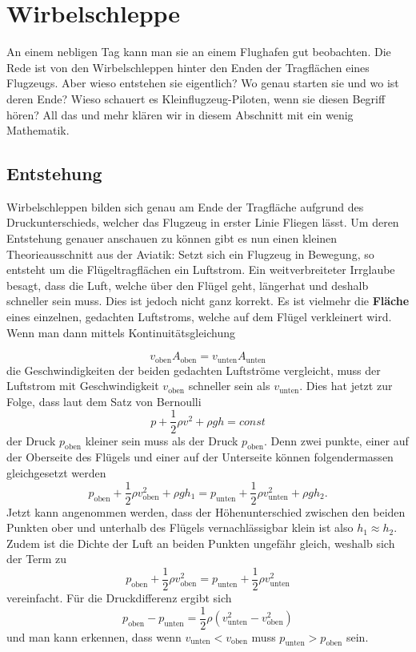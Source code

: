 %
%
%
\section{Wirbelschleppe}
An einem nebligen Tag kann man sie an einem Flughafen gut beobachten. 
Die Rede ist von den Wirbelschleppen hinter den Enden der Tragflächen eines Flugzeugs.
Aber wieso entstehen sie eigentlich? 
Wo genau starten sie und wo ist deren Ende?
Wieso schauert es Kleinflugzeug-Piloten, wenn sie diesen Begriff hören?
All das und mehr klären wir in diesem Abschnitt mit ein wenig Mathematik.

\subsection{Entstehung}
Wirbelschleppen bilden sich genau am Ende der Tragfläche aufgrund des Druckunterschieds, welcher das Flugzeug in erster Linie Fliegen lässt.
Um deren Entstehung genauer anschauen zu können gibt es nun einen kleinen Theorieausschnitt aus der Aviatik:
Setzt sich ein Flugzeug in Bewegung, so entsteht um die Flügeltragflächen ein Luftstrom.
Ein weitverbreiteter Irrglaube besagt, dass die Luft, welche über den Flügel geht, \glqq länger\grqq hat und deshalb schneller sein muss.
Dies ist jedoch nicht ganz korrekt.
Es ist vielmehr die \textbf{Fläche} eines einzelnen, gedachten Luftstroms, welche auf dem Flügel verkleinert wird.%
Wenn man dann mittels Kontinuitätsgleichung

\[
v_{\text{oben}}A_{\text{oben}} 
=
v_{\text{unten}}A_{\text{unten}}
\]
die Geschwindigkeiten der beiden gedachten Luftströme vergleicht, muss der Luftstrom mit Geschwindigkeit $v_{\text{oben}}$ schneller sein als $v_{\text{unten}}$.
Dies hat jetzt zur Folge, dass laut dem Satz von Bernoulli 
\[
p+\frac{1}{2}\rho v^2+\rho gh
=
const
\]
der Druck $p_{\text{oben}}$ kleiner sein muss als der Druck $p_{\text{oben}}$.
Denn zwei punkte, einer auf der Oberseite des Flügels und einer auf der Unterseite können folgendermassen gleichgesetzt werden
\[
p_{\text{oben}}+\frac{1}{2}\rho v^2_{\text{oben}} + \rho gh_1 
=
p_{\text{unten}}+\frac{1}{2}\rho v^2_{\text{unten}}+\rho gh_2.
\]
Jetzt kann angenommen werden, dass der Höhenunterschied zwischen den beiden Punkten ober und unterhalb des Flügels vernachlässigbar klein ist also \(h_1\approx h_2\).
Zudem ist die Dichte der Luft an beiden Punkten ungefähr gleich, weshalb sich der Term zu 
\[
p_{\text{oben}}+\frac{1}{2}\rho v^2_{\text{oben}} 
=
p_{\text{unten}}+\frac{1}{2}\rho v^2_{\text{unten}}
\]
vereinfacht.
Für die Druckdifferenz ergibt sich
\[
p_{\text{oben}}-p_{\text{unten}} 
=
\frac{1}{2}\rho( v^2_{\text{unten}}-v^2_{\text{oben}})
\]
und man kann erkennen, dass wenn $v_{\text{unten}} < v_{\text{oben}}$ muss $p_{\text{unten}} > p_{\text{oben}}$ sein.

